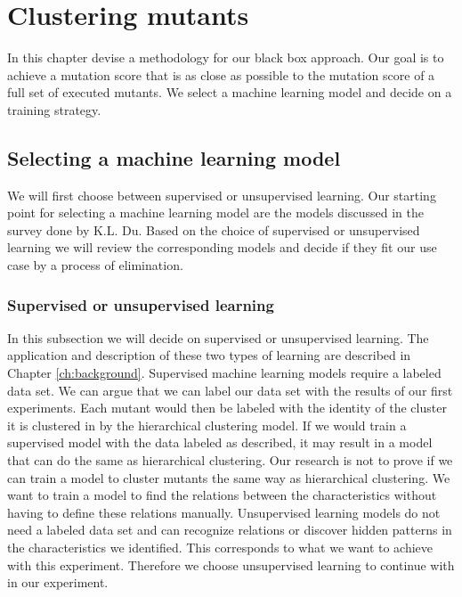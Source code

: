 \documentclass[../../main]{subfiles}
\begin{document}
\section{Clustering mutants}
In this chapter devise a methodology for our black box approach.
Our goal is to achieve a mutation score that is as close as possible to the mutation score of a full set of executed mutants.
We select a machine learning model and decide on a training strategy.

\subsection{Selecting a machine learning model}
We will first choose between supervised or unsupervised learning.
Our starting point for selecting a machine learning model are the models discussed in the survey done by K.L. Du.
Based on the choice of supervised or unsupervised learning we will review the corresponding models and decide if they fit our use case by a process of elimination.

\subsubsection{Supervised or unsupervised learning}
In this subsection we will decide on supervised or unsupervised learning.
The application and description of these two types of learning are described in Chapter \ref{ch:background}.
\newline
Supervised machine learning models require a labeled data set.
We can argue that we can label our data set with the results of our first experiments.
Each mutant would then be labeled with the identity of the cluster it is clustered in by the hierarchical clustering model.
If we would train a supervised model with the data labeled as described, it may result in a model that can do the same as hierarchical clustering.
Our research is not to prove if we can train a model to cluster mutants the same way as hierarchical clustering.
We want to train a model to find the relations between the characteristics without having to define these relations manually.
\newline
Unsupervised learning models do not need a labeled data set and can recognize relations or discover hidden patterns in the characteristics we identified.
This corresponds to what we want to achieve with this experiment.
Therefore we choose unsupervised learning to continue with in our experiment.
\end{document}
